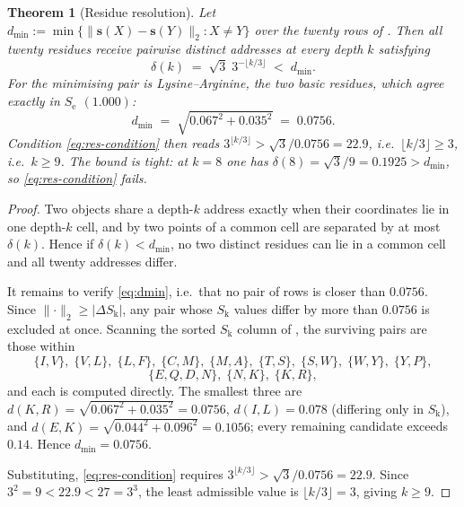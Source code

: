 \documentclass[11pt,twocolumn,a4paper]{article}
\theoremstyle{thmstyle}
\newtheorem{theorem}{Theorem}[section]
\theoremstyle{definition}
\theoremstyle{remark}
\newcommand{\Sk}{S_{\mathrm{k}}}
\newcommand{\Se}{S_{\mathrm{e}}}
\newcommand{\abs}[1]{\lvert#1\rvert}
\newcommand{\norm}[1]{\lVert#1\rVert}
\begin{document}
\begin{theorem}[Residue resolution]
\label{thm:aa-resolution}
Let
$d_{\min} := \min\{\norm{\mathbf{s}(X)-\mathbf{s}(Y)}_2 : X \neq Y\}$
over the twenty rows of . Then all twenty residues receive
pairwise distinct addresses at every depth $k$ satisfying
\begin{equation}
  \delta(k) \;=\; \sqrt3\;3^{-\lfloor k/3\rfloor} \;<\; d_{\min}.
  \label{eq:res-condition}
\end{equation}
For  the minimising pair is Lysine--Arginine, the two
basic residues, which agree exactly in $\Se$ $(1.000)$:
\begin{equation}
  d_{\min} \;=\; \sqrt{0.067^2 + 0.035^2} \;=\; 0.0756 .
  \label{eq:dmin}
\end{equation}
Condition \eqref{eq:res-condition} then reads
$3^{\lfloor k/3\rfloor} > \sqrt3/0.0756 = 22.9$, i.e.\
$\lfloor k/3\rfloor \geq 3$, i.e.\ $k \geq 9$. The bound is tight: at
$k = 8$ one has $\delta(8) = \sqrt3/9 = 0.1925 > d_{\min}$, so
\eqref{eq:res-condition} fails.
\end{theorem}

\begin{proof}
Two objects share a depth-$k$ address exactly when their coordinates
lie in one depth-$k$ cell, and by \Cref{cor:cell-diag} two points of a
common cell are separated by at most $\delta(k)$. Hence if
$\delta(k) < d_{\min}$, no two distinct residues can lie in a common
cell and all twenty addresses differ.

It remains to verify \eqref{eq:dmin}, i.e.\ that no pair of rows is
closer than $0.0756$. Since $\norm{\cdot}_2 \geq \abs{\Delta \Sk}$, any
pair whose $\Sk$ values differ by more than $0.0756$ is excluded at
once. Scanning the sorted $\Sk$ column of \Cref{tab:aa}, the surviving
pairs are those within
\[
  \{I,V\},\;\{V,L\},\;\{L,F\},\;\{C,M\},\;\{M,A\},\;\{T,S\},\;
  \{S,W\},\;\{W,Y\},\;\{Y,P\},
\]
\[
  \{E,Q,D,N\},\;\{N,K\},\;\{K,R\},
\]
and each is computed directly. The smallest three are
$d(K,R) = \sqrt{0.067^2+0.035^2} = 0.0756$,
$d(I,L) = 0.078$ (differing only in $\Sk$), and
$d(E,K) = \sqrt{0.044^2 + 0.096^2} = 0.1056$; every remaining candidate
exceeds $0.14$. Hence $d_{\min} = 0.0756$.

Substituting, \eqref{eq:res-condition} requires
$3^{\lfloor k/3\rfloor} > \sqrt3/0.0756 = 22.9$. Since $3^2 = 9 < 22.9
< 27 = 3^3$, the least admissible value is
$\lfloor k/3\rfloor = 3$, giving $k \geq 9$.
\end{proof}
\end{document}
